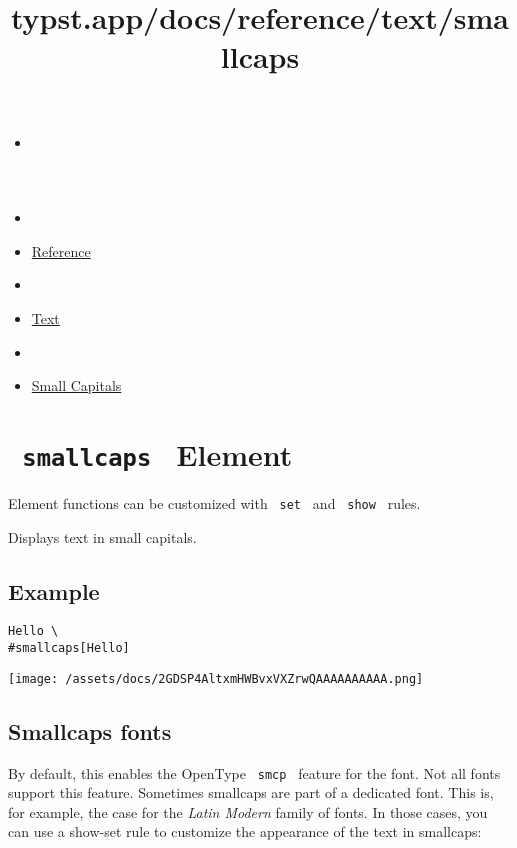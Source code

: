 \title{typst.app/docs/reference/text/smallcaps}

\begin{itemize}
\tightlist
\item
  \href{/docs}{}
\item
  
\item
  \href{/docs/reference/}{Reference}
\item
  
\item
  \href{/docs/reference/text/}{Text}
\item
  
\item
  \href{/docs/reference/text/smallcaps/}{Small Capitals}
\end{itemize}

\section{\texorpdfstring{\texttt{\ smallcaps\ } {{ Element
}}}{ smallcaps   Element }}\label{summary}

\label{element-tooltip}
Element functions can be customized with \texttt{\ set\ } and
\texttt{\ show\ } rules.

Displays text in small capitals.

\subsection{Example}\label{example}

\begin{verbatim}
Hello \
#smallcaps[Hello]
\end{verbatim}

\texttt{[image: /assets/docs/2GDSP4AltxmHWBvxVXZrwQAAAAAAAAAA.png]}

\subsection{Smallcaps fonts}\label{smallcaps-fonts}

By default, this enables the OpenType \texttt{\ smcp\ } feature for the
font. Not all fonts support this feature. Sometimes smallcaps are part
of a dedicated font. This is, for example, the case for the \emph{Latin
Modern} family of fonts. In those cases, you can use a show-set rule to
customize the appearance of the text in smallcaps:

